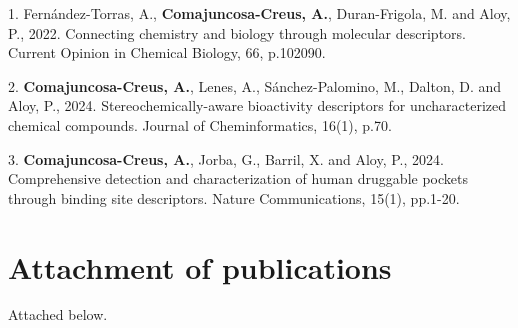 1. Fernández-Torras, A., \textbf{Comajuncosa-Creus, A.}, Duran-Frigola, M. and Aloy, P., 2022. Connecting chemistry and biology through molecular descriptors. Current Opinion in Chemical Biology, 66, p.102090.

2. \textbf{Comajuncosa-Creus, A.}, Lenes, A., Sánchez-Palomino, M., Dalton, D. and Aloy, P., 2024. Stereochemically-aware bioactivity descriptors for uncharacterized chemical compounds. Journal of Cheminformatics, 16(1), p.70.

3. \textbf{Comajuncosa-Creus, A.}, Jorba, G., Barril, X. and Aloy, P., 2024. Comprehensive detection and characterization of human druggable pockets through binding site descriptors. Nature Communications, 15(1), pp.1-20.

\newpage
\section{Attachment of publications}

Attached below.

